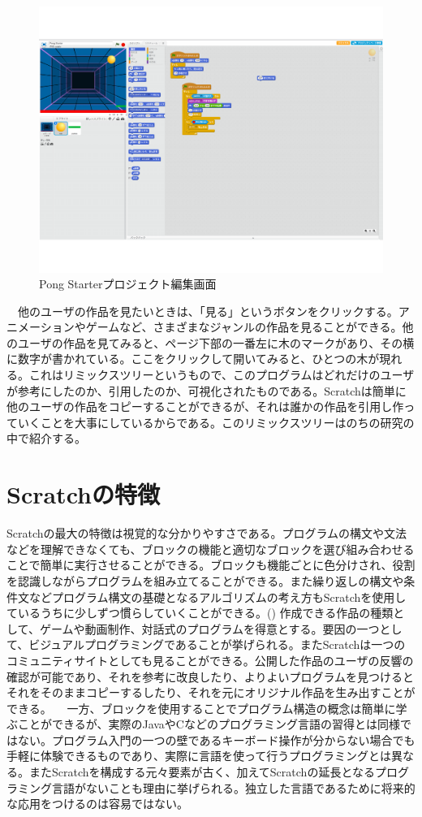 \documentclass[a4paper,10pt,onecolumn,oneside,openany]{jsbook}
\begin{document}
 \begin{figure}[!h]
  \centering
   \includegraphics[scale=0.5]{pong_starter_editor.pdf}
  \caption{Pong Starterプロジェクト編集画面}
  \label{pseditor}
 \end{figure}
　他のユーザの作品を見たいときは、「見る」というボタンをクリックする。アニメーションやゲームなど、さまざまなジャンルの作品を見ることができる。他のユーザの作品を見てみると、ページ下部の一番左に木のマークがあり、その横に数字が書かれている。ここをクリックして開いてみると、ひとつの木が現れる。これはリミックスツリーというもので、このプログラムはどれだけのユーザが参考にしたのか、引用したのか、可視化されたものである。Scratchは簡単に他のユーザの作品をコピーすることができるが、それは誰かの作品を引用し作っていくことを大事にしているからである。このリミックスツリーはのちの研究の中で紹介する。
\section{Scratchの特徴}
Scratchの最大の特徴は視覚的な分かりやすさである。プログラムの構文や文法などを理解できなくても、ブロックの機能と適切なブロックを選び組み合わせることで簡単に実行させることができる。ブロックも機能ごとに色分けされ、役割を認識しながらプログラムを組み立てることができる。また繰り返しの構文や条件文などプログラム構文の基礎となるアルゴリズムの考え方もScratchを使用しているうちに少しずつ慣らしていくことができる。(\cite{scratch_article}) 作成できる作品の種類として、ゲームや動画制作、対話式のプログラムを得意とする。要因の一つとして、ビジュアルプログラミングであることが挙げられる。またScratchは一つのコミュニティサイトとしても見ることができる。公開した作品のユーザの反響の確認が可能であり、それを参考に改良したり、よりよいプログラムを見つけるとそれをそのままコピーするしたり、それを元にオリジナル作品を生み出すことができる。
　一方、ブロックを使用することでプログラム構造の概念は簡単に学ぶことができるが、実際のJavaやCなどのプログラミング言語の習得とは同様ではない。プログラム入門の一つの壁であるキーボード操作が分からない場合でも手軽に体験できるものであり、実際に言語を使って行うプログラミングとは異なる。またScratchを構成する元々要素が古く、加えてScratchの延長となるプログラミング言語がないことも理由に挙げられる。独立した言語であるために将来的な応用をつけるのは容易ではない。
\end{document}

